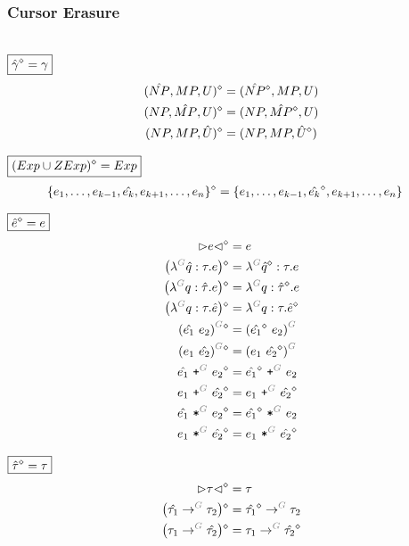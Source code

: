 \subsubsection{Cursor Erasure}\hspace*{\fill} \\

\noindent $\boxed{\hat{\gamma}\mathclose{}^{\diamond} = \gamma}$
%
\begin{align*}
  (\hat{NP}, MP, U)\mathclose{}^{\diamond} &= (\hat{NP}\mathclose{}^{\diamond}, MP, U) \\
  (NP, \hat{MP}, U)\mathclose{}^{\diamond} &= (NP, \hat{MP}\mathclose{}^{\diamond}, U) \\
  (NP, MP, \hat{U})\mathclose{}^{\diamond} &= (NP, MP, \hat{U}\mathclose{}^{\diamond})
\end{align*}

\noindent $\boxed{\left(Exp \cup ZExp\right)\mathclose{}^{\diamond} = Exp}$
%
\begin{align*}
  \left\{e_1, \ldots, e_{k-1}, \hat{e_k}, e_{k+1}, \ldots, e_n\right\}\mathclose{}^{\diamond} &= \left\{e_1, \ldots, e_{k-1}, \hat{e_k}\mathclose{}^{\diamond}, e_{k+1}, \ldots, e_n\right\}
\end{align*}

\noindent $\boxed{\hat{e}\mathclose{}^{\diamond} = e}$
%
\begin{align*}
  \erase{\cursor{e}} &= e \\
  \erase{\left(\eFun{G}{\hat{q}}{\tau}{e}\right)} &= \eFun{G}{\erase{\hat{q}}}{\tau}{e} \\
  \erase{\left(\eFun{G}{q}{\hat{\tau}}{e}\right)} &= \eFun{G}{q}{\erase{\hat{\tau}}}{e} \\
  \erase{\left(\eFun{G}{q}{\tau}{\hat{e}}\right)} &= \eFun{G}{q}{\tau}{\erase{\hat{e}}} \\
  \erase{\eApp{G}{\hat{e_1}}{e_2}} &= \eApp{G}{\erase{\hat{e_1}}}{e_2} \\
  \erase{\eApp{G}{e_1}{\hat{e_2}}} &= \eApp{G}{e_1}{\erase{\hat{e_2}}} \\
  \erase{\ePlus{G}{\hat{e_1}}{e_2}} &= \ePlus{G}{\erase{\hat{e_1}}}{e_2} \\
  \erase{\ePlus{G}{e_1}{\hat{e_2}}} &= \ePlus{G}{e_1}{\erase{\hat{e_2}}} \\
  \erase{\eTimes{G}{\hat{e_1}}{e_2}} &= \eTimes{G}{\erase{\hat{e_1}}}{e_2} \\
  \erase{\eTimes{G}{e_1}{\hat{e_2}}} &= \eTimes{G}{e_1}{\erase{\hat{e_2}}}
\end{align*}

\noindent $\boxed{\hat{\tau}\mathclose{}^{\diamond} = \tau}$
%
\begin{align*}
  \erase{\cursor{\tau}} &= \tau \\
  \erase{\left(\tArrow{G}{\hat{\tau_1}}{\tau_2}\right)} &= \tArrow{G}{\erase{\hat{\tau_1}}}{\tau_2} \\
  \erase{\left(\tArrow{G}{\tau_1}{\hat{\tau_2}}\right)} &= \tArrow{G}{\tau_1}{\erase{\hat{\tau_2}}}
\end{align*}

